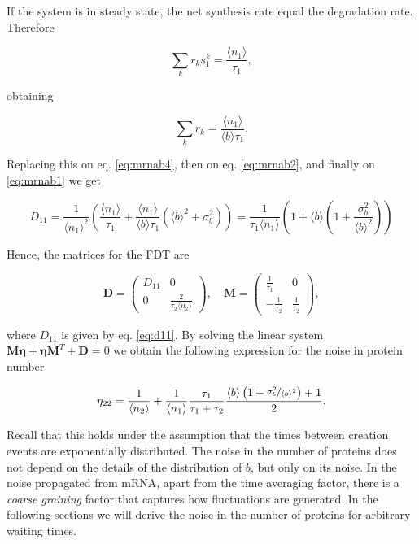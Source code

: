 If the system is in steady state, the net synthesis rate equal the degradation rate. Therefore

\begin{equation*}
  \sum_kr_ks_1^k = \frac{\langle n_1\rangle}{\tau_1},
\end{equation*}

obtaining

\begin{equation*}
   \sum_kr_k = \frac{\langle n_1\rangle}{\langle b\rangle\tau_1}.
\end{equation*}

Replacing this on eq. \eqref{eq:mrnab4}, then on eq. \eqref{eq:mrnab2}, and finally on \eqref{eq:mrnab1} we get

\begin{equation}
  \label{eq:d11}
  D_{11}=\frac{1}{\langle n_1\rangle^2}\left(\frac{\langle n_1\rangle}{\tau_1}+\frac{\langle n_1\rangle}{\langle b\rangle\tau_1}\left(\langle b\rangle^2+\sigma_b^2\right)\right) = \frac{1}{\tau_1\langle n_1\rangle}\left( 1+ \langle b\rangle\left(1+\frac{\sigma_b^2}{\langle b\rangle^2}\right)\right)
\end{equation}

Hence, the matrices for the FDT are

\begin{equation*}
  \mathbf{D} = 
  \begin{pmatrix}
    D_{11} & 0 \\
    0 & \frac{2}{\tau_2\langle n_2\rangle}
  \end{pmatrix}, \quad
  \mathbf{M} =
  \begin{pmatrix}
    \frac{1}{\tau_1} & 0 \\
    -\frac{1}{\tau_2} & \frac{1}{\tau_2}
  \end{pmatrix},
\end{equation*}

where $D_{11}$ is given by eq. \eqref{eq:d11}. By solving the linear system $\mathbf{M}\mathbf{\eta} + \mathbf{\eta M}^T+\mathbf{D}=0$ we obtain the following expression for the noise in protein number

\begin{equation*}
  \eta_{22}=\frac{1}{\langle n_2\rangle} + \frac{1}{\langle n_1\rangle} \frac{\tau_1}{\tau_1 + \tau_2} \frac{\langle b\rangle\left(1+\nicefrac{\sigma_b^2}{\langle b\rangle^2}\right)+1}{2}.
\end{equation*}

Recall that this holds under the assumption that the times between creation events are exponentially distributed. The noise in the number of proteins does not depend on the details of the distribution of $b$, but only on its noise. In the noise propagated from mRNA, apart from the time averaging factor, there is a \textit{coarse graining} factor that captures how fluctuations are generated. In the following sections we will derive the noise in the number of proteins for arbitrary waiting times.

